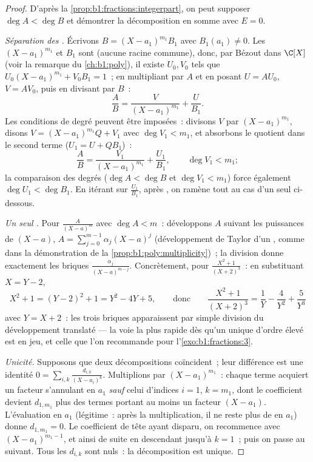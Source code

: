 \begin{proof}
D'après la \cref{prop:b1:fractions:integerpart}, on peut supposer $\deg
A < \deg B$ et démontrer la décomposition en somme avec $E = 0$.

\emph{Séparation des .} Écrivons $B = (X - a_1)^{m_1} B_1$ avec
$B_1(a_1) \neq 0$. Les  $(X-a_1)^{m_1}$ et $B_1$ sont  (aucune racine commune), donc, par Bézout dans $\C[X]$ (voir
la remarque du \cref{ch:b1:poly}), il existe $U_0, V_0$ tels que $U_0
(X-a_1)^{m_1} + V_0 B_1 = 1$~; en multipliant par $A$ et en posant $U =
AU_0$, $V = AV_0$, puis en divisant par $B$~:
\[
\frac AB = \frac{V}{(X - a_1)^{m_1}} + \frac{U}{B_1} .
\]
Les conditions de degré peuvent être imposées~: divisons $V$ par
$(X-a_1)^{m_1}$, disons $V = (X-a_1)^{m_1}Q + V_1$ avec $\deg V_1 <
m_1$, et absorbons le quotient dans le second terme ($U_1 = U +
QB_1$)~:
\[
\frac AB = \frac{V_1}{(X - a_1)^{m_1}} + \frac{U_1}{B_1},
\qquad \deg V_1 < m_1 ;
\]
la comparaison des degrés ($\deg A < \deg B$ et $\deg V_1 < m_1$) force
également $\deg U_1 < \deg B_1$. En itérant sur $\frac{U_1}{B_1}$, 
après , on ramène tout au cas d'un seul  ci-dessous.

\emph{Un seul .} Pour $\frac{A}{(X-a)^m}$ avec $\deg A < m$~:
développons $A$ suivant les puissances de $(X - a)$, $A =
\sum_{j=0}^{m-1} \alpha_j (X - a)^j$ (développement de Taylor d'un
, comme dans la démonstration de la
\cref{prop:b1:poly:multiplicity})~; la division donne exactement les
briques $\frac{\alpha_j}{(X-a)^{m-j}}$. Concrètement, pour $\frac{X^2 +
1}{(X+2)^3}$~: en substituant $X = Y - 2$,
\[
X^2 + 1 = (Y - 2)^2 + 1 = Y^2 - 4Y + 5 ,
\qquad\text{donc}\qquad
\frac{X^2+1}{(X+2)^3} = \frac1{Y} - \frac4{Y^2} + \frac5{Y^3}
\]
avec $Y = X + 2$~: les trois briques apparaissent par simple division du
développement translaté --- la voie la plus rapide dès qu'un unique 
d'ordre élevé est en jeu, et celle que l'on recommande pour
l'\cref{exo:b1:fractions:3}.

\emph{Unicité.} Supposons que deux décompositions coïncident~; leur
différence est une identité $0 = \sum_{i,k} \frac{d_{i,k}}{(X -
a_i)^k}$. Multiplions par $(X - a_1)^{m_1}$~: chaque terme acquiert un
facteur s'annulant en $a_1$ \emph{sauf} celui d'indices $i = 1$, $k =
m_1$, dont le coefficient devient $d_{1,m_1}$ plus des termes portant au
moins un facteur $(X - a_1)$. L'évaluation en $a_1$ (légitime~: après la
multiplication, il ne reste plus de  en $a_1$) donne $d_{1,m_1} =
0$. Le coefficient de tête ayant disparu, on recommence avec $(X -
a_1)^{m_1 - 1}$, et ainsi de suite en descendant jusqu'à $k = 1$~; puis
on passe au  suivant. Tous les $d_{i,k}$ sont nuls~: la
décomposition est unique.
\end{proof}

